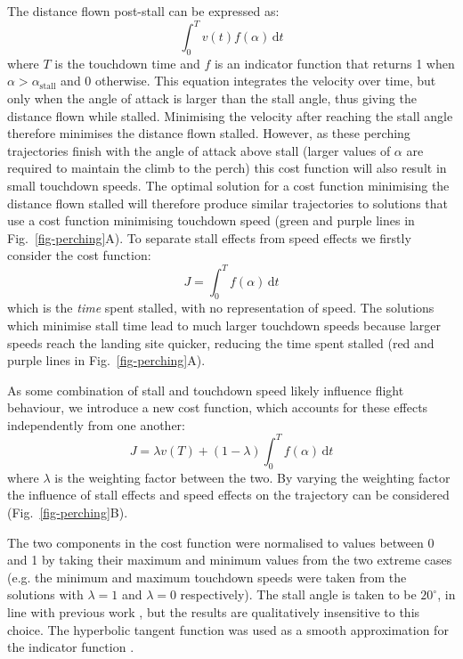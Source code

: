 The distance flown post-stall can be expressed as:
\begin{equation}
    \int_0^T v(t)f(\alpha)\,\mathrm{d}t
\end{equation}
where $T$ is the touchdown time and $f$ is an indicator function that returns 1 when $\alpha > \alpha_{\mathrm{stall}}$ and 0 otherwise. This equation integrates the velocity over time, but only when the angle of attack is larger than the stall angle, thus giving the distance flown while stalled. Minimising the velocity after reaching the stall angle therefore minimises the distance flown stalled. However, as these perching trajectories finish with the angle of attack above stall (larger values of $\alpha$ are required to maintain the climb to the perch) this cost function will also result in small touchdown speeds. The optimal solution for a cost function minimising the distance flown stalled will therefore produce similar trajectories to solutions that use a cost function minimising touchdown speed (green and purple lines in Fig.~\ref{fig-perching}A). To separate stall effects from speed effects we firstly consider the cost function:
\begin{equation}
    J = \int_0^T f(\alpha)\,\mathrm{d}t
\end{equation}
which is the \emph{time} spent stalled, with no representation of speed. The solutions which minimise stall time lead to much larger touchdown speeds because larger speeds reach the landing site quicker, reducing the time spent stalled (red and purple lines in Fig.~\ref{fig-perching}A).

As some combination of stall and touchdown speed likely influence flight behaviour, we introduce a new cost function, which accounts for these effects independently from one another:
\begin{equation}
    J = \lambda v(T) + (1-\lambda)\int_0^T f(\alpha)\,\mathrm{d}t
\end{equation}
where $\lambda$ is the weighting factor between the two. By varying the weighting factor the influence of stall effects and speed effects on the trajectory can be considered (Fig.~\ref{fig-perching}B).

The two components in the cost function were normalised to values between 0 and 1 by taking their maximum and minimum values from the two extreme cases (e.g. the minimum and maximum touchdown speeds were taken from the solutions with $\lambda=1$ and $\lambda=0$ respectively). The stall angle is taken to be $20^\circ$, in line with previous work \cite{wuestAgilePerchingManeuvers2024}, but the results are qualitatively insensitive to this choice. The hyperbolic tangent function was used as a smooth approximation for the indicator function \cite{wuestAgilePerchingManeuvers2024}.

